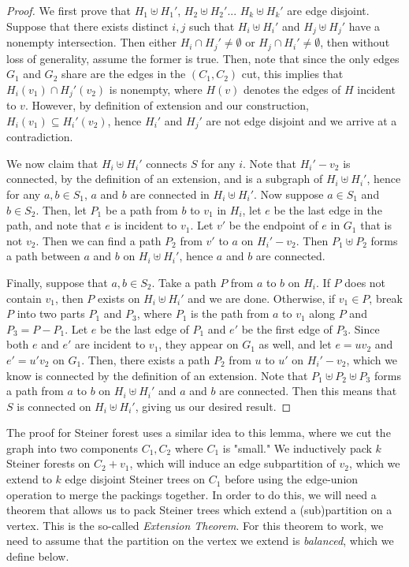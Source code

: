 \documentclass{article}
\begin{document}
\begin{proof}
    We first prove that $H_1 \uplus H_1'$, $H_2 \uplus H_2'$... $H_k \uplus H_k'$ are edge disjoint. Suppose that there exists distinct $i,j$ such that $H_i \uplus H_i'$ and $H_j \uplus H_j'$ have a nonempty intersection. Then either $H_i \cap H_j' \not= \emptyset$ or $H_j \cap H_i' \not= \emptyset$, then without loss of generality, assume the former is true.
    Then, note that since the only edges $G_1$ and $G_2$ share are the edges in the $(C_1,C_2)$ cut, this implies that $H_i(v_1) \cap H_j'(v_2)$ is nonempty, where $H(v)$ denotes the edges of $H$ incident to $v$. However, by definition of extension and our construction, $H_i(v_1) \subseteq H_i'(v_2)$, hence $H_i'$ and $H_j'$ are not edge disjoint and we arrive at a contradiction. 

    We now claim that $H_i \uplus H_i'$ connects $S$ for any $i$. Note that $H_i'-v_2$ is connected, by the definition of an extension, and is a subgraph of $H_i \uplus H_i'$, hence for any $a,b \in S_1$, $a$ and $b$ are connected in $H_i \uplus H_i'$. Now suppose $a \in S_1$ and $b \in S_2$. Then, let $P_1$ be a path from $b$ to $v_1$ in $H_i$, let $e$ be the last edge in the path, and note that $e$ is incident to $v_1$. Let $v'$ be the endpoint of $e$ in $G_1$ that is not $v_2$. Then we can find a path $P_2$ from $v'$ to $a$ on $H_i'-v_2$. Then $P_1 \uplus P_2$ forms a path between $a$ and $b$ on $H_i \uplus H_i'$, hence $a$ and $b$ are connected. 
    
    Finally, suppose that $a,b \in S_2$. Take a path $P$ from $a$ to $b$ on $H_i$. If $P$ does not contain $v_1$, then $P$ exists on $H_i \uplus H_i'$ and we are done. Otherwise, if $v_1 \in P$, break $P$ into two parts $P_1$ and $P_3$, where $P_1$ is the path from $a$ to $v_1$ along $P$ and $P_3 = P-P_1$. Let $e$ be the last edge of $P_1$ and $e'$ be the first edge of $P_3$. Since both $e$ and $e'$ are incident to $v_1$, they appear on $G_1$ as well, and let $e=uv_2$ and $e' = u'v_2$ on $G_1$. Then, there exists a path $P_2$ from $u$ to $u'$ on $H_i'-v_2$, which we know is connected by the definition of an extension. Note that $P_1 \uplus P_2 \uplus P_3$ forms a path from $a$ to $b$ on $H_i \uplus H_i'$ and $a$ and $b$ are connected. Then this means that $S$ is connected on $H_i \uplus H_i'$, giving us our desired result. 
\end{proof}

The proof for Steiner forest uses a similar idea to this lemma, where we cut the graph into two components $C_1,C_2$ where $C_1$ is "small." We inductively pack $k$ Steiner forests on $C_2+v_1$, which will induce an edge subpartition of $v_2$, which we extend to $k$ edge disjoint Steiner trees on $C_1$ before using the edge-union operation to merge the packings together. In order to do this, we will need a theorem that allows us to pack Steiner trees which extend a (sub)partition on a vertex. This is the so-called \emph{Extension Theorem}. For this theorem to work, we need to assume that the partition on the vertex we extend is \emph{balanced}, which we define below. 
\end{document}
